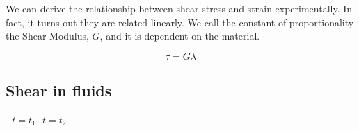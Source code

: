 We can derive the relationship between shear stress and strain experimentally. In fact, it turns out they are related linearly. We call the constant of proportionality the Shear Modulus, $G$, and it is dependent on the material.

\begin{equation}\label{eq:shear-in-solids}
  \tau = G \lambda
\end{equation}

\subsection{Shear in fluids}

$~~~ t = t_1 ~~~ t = t_2 $
